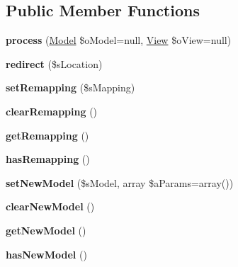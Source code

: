 \subsection*{Public Member Functions}
\begin{DoxyCompactItemize}
\item 
\hypertarget{class_controller_afc4c987996b64e65c22371c26015df6b}{{\bfseries process} (\hyperlink{class_model}{Model} \$o\-Model=null, \hyperlink{class_view}{View} \$o\-View=null)}\label{class_controller_afc4c987996b64e65c22371c26015df6b}

\item 
\hypertarget{class_controller_aea105c49f6bcbb98d5ca9dedcec7cd15}{{\bfseries redirect} (\$s\-Location)}\label{class_controller_aea105c49f6bcbb98d5ca9dedcec7cd15}

\item 
\hypertarget{class_controller_a85c72af6e36c33c3050707f74cd1880d}{{\bfseries set\-Remapping} (\$s\-Mapping)}\label{class_controller_a85c72af6e36c33c3050707f74cd1880d}

\item 
\hypertarget{class_controller_ac08a33d376ad1bf3fc19b966e7c55d94}{{\bfseries clear\-Remapping} ()}\label{class_controller_ac08a33d376ad1bf3fc19b966e7c55d94}

\item 
\hypertarget{class_controller_a5dc297c7af45f8419325869345889816}{{\bfseries get\-Remapping} ()}\label{class_controller_a5dc297c7af45f8419325869345889816}

\item 
\hypertarget{class_controller_a8bd5677f0ca175b9a525e114c6dab894}{{\bfseries has\-Remapping} ()}\label{class_controller_a8bd5677f0ca175b9a525e114c6dab894}

\item 
\hypertarget{class_controller_a6c3f9b1005eb5d33de0612062a0699d8}{{\bfseries set\-New\-Model} (\$s\-Model, array \$a\-Params=array())}\label{class_controller_a6c3f9b1005eb5d33de0612062a0699d8}

\item 
\hypertarget{class_controller_aff67b20dd710b149b45d548df14acc1f}{{\bfseries clear\-New\-Model} ()}\label{class_controller_aff67b20dd710b149b45d548df14acc1f}

\item 
\hypertarget{class_controller_a75525577704ae2ccdbe555cfe52fb212}{{\bfseries get\-New\-Model} ()}\label{class_controller_a75525577704ae2ccdbe555cfe52fb212}

\item 
\hypertarget{class_controller_a64ae494bb633470d16effe74f4a41406}{{\bfseries has\-New\-Model} ()}\label{class_controller_a64ae494bb633470d16effe74f4a41406}


\end{DoxyCompactItemize}
